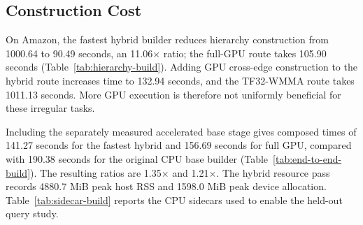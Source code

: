 \subsection{Construction Cost}
\authoritativeBuildResults
On Amazon, the fastest hybrid builder reduces hierarchy construction from
1000.64 to 90.49 seconds, an 11.06$\times$ ratio; the full-GPU route takes
105.90 seconds (Table~\ref{tab:hierarchy-build}). Adding GPU cross-edge
construction to the hybrid route increases time to 132.94 seconds, and the
TF32-WMMA route takes 1011.13 seconds. More GPU execution is therefore
not uniformly beneficial for these irregular tasks.

Including the separately measured accelerated base stage gives composed
times of 141.27 seconds for the fastest hybrid and 156.69 seconds for full
GPU, compared with 190.38 seconds for the original CPU base builder
(Table~\ref{tab:end-to-end-build}). The resulting ratios are 1.35$\times$
and 1.21$\times$. The hybrid resource pass records 4880.7 MiB peak host
RSS and 1598.0 MiB peak device allocation. Table~\ref{tab:sidecar-build}
reports the CPU sidecars used to enable the held-out query study.
